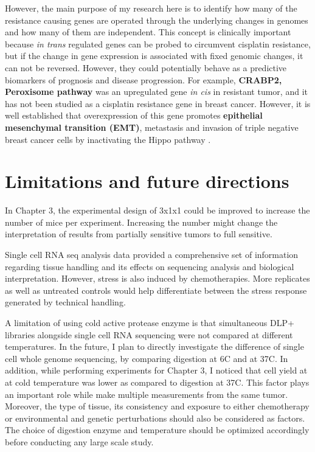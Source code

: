 However, the main purpose of my research here is to identify how many of the resistance causing genes are operated through the underlying changes in genomes and how many of them are independent. This concept is clinically important because \textit{in trans} regulated genes can be probed to circumvent cisplatin resistance, but if the change in gene expression is associated with fixed genomic changes, it can not be reversed. However, they could potentially behave as a predictive biomarkers of prognosis and disease progression. For example, {\textbf{CRABP2, Peroxisome pathway}} was an upregulated gene \textit{in cis} in resistant tumor, and it has not been studied as a cisplatin resistance gene in breast cancer. However, it is well established that overexpression of this gene promotes \textbf{epithelial mesenchymal transition (EMT)}, metastasis and invasion of triple negative breast cancer cells by inactivating the Hippo pathway \cite{feng2019crabp2}.

\section{Limitations and future directions}

In Chapter 3, the experimental design of 3x1x1 could be improved to increase the number of mice per experiment. Increasing the number might change the interpretation of results from partially sensitive tumors to full sensitive. 

Single cell RNA seq analysis data provided a comprehensive set of information regarding tissue handling and its effects on sequencing analysis and biological interpretation. 
However, stress is also induced by chemotherapies. More replicates as well as untreated controls would help differentiate between the stress response generated by technical handling.

A limitation of using cold active protease enzyme is that  simultaneous \ac{DLP+} libraries alongside single cell RNA sequencing were not compared at different temperatures. In the future, I plan to directly investigate the difference of single cell whole genome sequencing, by comparing digestion at 6\textdegree C and at 37\textdegree C. In addition, while performing  experiments for Chapter 3, I noticed that cell yield at at cold temperature was lower as compared to digestion at 37\textdegree C. This factor plays an important role while make multiple measurements from the same tumor. Moreover, the type of tissue, its consistency and exposure to either chemotherapy or environmental and genetic perturbations should also be considered as factors. The choice of digestion enzyme and temperature should be optimized accordingly before conducting any large scale study.

